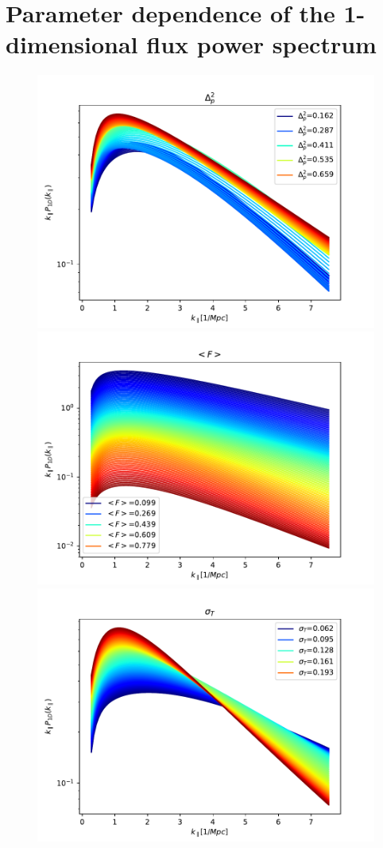 \documentclass[]{article}
\begin{document}
\section{Parameter dependence of the 1-dimensional flux power spectrum}
\begin{figure}[h]
    \centering
    \includegraphics[scale=0.47]{Figures/256_Delta2_p.pdf}
    \includegraphics[scale=0.47]{Figures/256_mF.pdf}
    \includegraphics[scale=0.47]{Figures/256_sigT_Mpc.pdf}

\end{figure}
\end{document}
